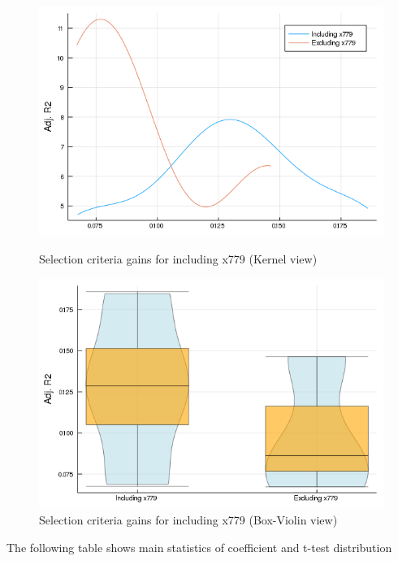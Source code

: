 \documentclass{article}
\begin{document}
\begin{figure}[!ht]
  \begin{minipage}[b]{0.48\textwidth}
    \centering
    \includegraphics[width=\textwidth]{Kdensity_criteria_x779.png}
    \caption{Selection criteria gains for including x779 (Kernel view)}
  \end{minipage}
  \hfill
  \begin{minipage}[b]{0.48\textwidth}
    \centering    
    \includegraphics[width=\textwidth]{BoxViolinDot_x779.png}
    \caption{Selection criteria gains for including x779 (Box-Violin view)}    
  \end{minipage}
\end{figure}

\vspace{1cm}

The following table shows main statistics of coefficient and t-test distribution 
\end{document}

